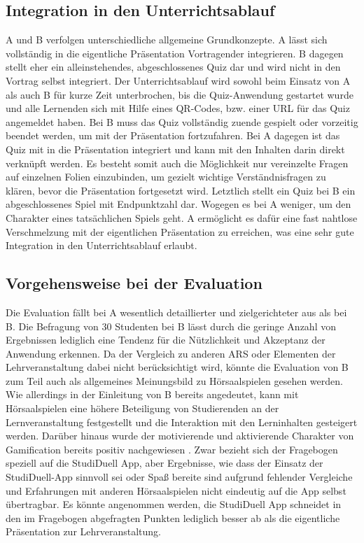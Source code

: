 \documentclass[conference]{IEEEtran}
\begin{document}
\subsection{Integration in den Unterrichtsablauf}
A und B verfolgen unterschiedliche allgemeine Grundkonzepte. A lässt sich vollständig in die eigentliche Präsentation Vortragender integrieren. B dagegen stellt eher ein alleinstehendes, abgeschlossenes Quiz dar und wird nicht in den Vortrag selbst integriert. Der Unterrichtsablauf wird sowohl beim Einsatz von A als auch B für kurze Zeit unterbrochen, bis die Quiz-Anwendung gestartet wurde und alle Lernenden sich mit Hilfe eines QR-Codes, bzw. einer URL für das Quiz angemeldet haben. Bei B muss das Quiz vollständig zuende gespielt oder vorzeitig beendet werden, um mit der Präsentation fortzufahren. Bei A dagegen ist das Quiz mit in die Präsentation integriert und kann mit den Inhalten darin direkt verknüpft werden. Es besteht somit auch die Möglichkeit nur vereinzelte Fragen auf einzelnen Folien einzubinden, um gezielt wichtige Verständnisfragen zu klären, bevor die Präsentation fortgesetzt wird. Letztlich stellt ein Quiz bei B ein abgeschlossenes Spiel mit Endpunktzahl dar. Wogegen es bei A weniger, um den Charakter eines tatsächlichen Spiels geht. A ermöglicht es dafür eine fast nahtlose Verschmelzung mit der eigentlichen Präsentation zu erreichen, was eine sehr gute Integration in den Unterrichtsablauf erlaubt.

\subsection{Vorgehensweise bei der Evaluation}
Die Evaluation fällt bei A wesentlich detaillierter und zielgerichteter aus als bei B. Die Befragung von 30 Studenten bei B lässt durch die geringe Anzahl von Ergebnissen lediglich eine Tendenz für die Nützlichkeit und Akzeptanz der Anwendung erkennen. Da der Vergleich zu anderen ARS oder Elementen der Lehrveranstaltung dabei nicht berücksichtigt wird, könnte die Evaluation von B zum Teil auch als allgemeines Meinungsbild zu Hörsaalspielen gesehen werden. Wie allerdings in der Einleitung von B bereits angedeutet, kann mit Hörsaalspielen eine höhere Beteiligung von Studierenden an der Lernveranstaltung festgestellt und die Interaktion mit den Lerninhalten gesteigert werden. Darüber hinaus wurde der motivierende und aktivierende Charakter von Gamification bereits positiv nachgewiesen \cite[S. 339f]{Hobert2017}. Zwar bezieht sich der Fragebogen speziell auf die StudiDuell App, aber Ergebnisse, wie dass der Einsatz der StudiDuell-App sinnvoll sei oder Spaß bereite sind aufgrund fehlender Vergleiche und Erfahrungen mit anderen Hörsaalspielen nicht eindeutig auf die App selbst übertragbar. Es könnte angenommen werden, die StudiDuell App schneidet in den im Fragebogen abgefragten Punkten lediglich besser ab als die eigentliche Präsentation zur Lehrveranstaltung.
\end{document}
